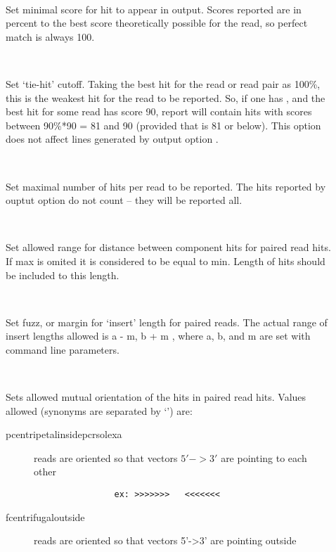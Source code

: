 \documentclass[english,letter]{article}
\begin{document}
\begin{description}
\item[~~]
				Set minimal score for hit to appear in output.  Scores reported are 
                in percent to the best score theoretically possible for the read, so 
                perfect match is always 100.
\item[~~]
				Set `tie-hit' cutoff. Taking the best hit for the read or read
                pair as 100\%, this is the weakest hit for the read to be
                reported. So, if one has , and the best hit for some read
                has score 90, report will contain hits with scores between
                90\%*90 = 81 and 90 (provided that  is 81 or below). This
                option does not affect lines generated by output option .
\item[~~]
				Set maximal number of hits per read to be reported. The hits
                reported by ouptut option  do not count -- they will be
                reported all.
\item[~~]    
				Set allowed range for distance between component hits for 
                paired read hits. If max is omited it is considered to be equal 
                to min. Length of hits should be included to this length. 
\item[~~]
				Set fuzz, or margin for `insert' length for paired reads. The
                actual range of insert lengths allowed is \Lbr a - m, b + m \Rbr,
                where a, b, and m are set with   command line parameters.
\item[~~]
				Sets allowed mutual orientation of the hits in paired read hits. 
                Values allowed (synonyms are separated by `\Bar ') are:
	\begin{description}
	\item[p\Bar centripetal\Bar inside\Bar pcr\Bar solexa]
				reads are oriented so that vectors $5'->3'$ are pointing to each other
	\begin{verbatim}
                ex: >>>>>>>   <<<<<<<
	\end{verbatim}
	\item[f\Bar centrifugal\Bar outside]
				reads are oriented so that vectors 5'->3' are pointing outside

\end{description}
\end{description}
\end{document}
